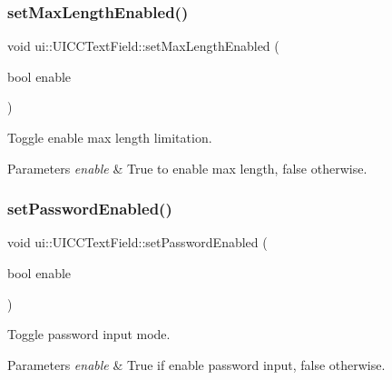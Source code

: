 \subsubsection{\texorpdfstring{set\+Max\+Length\+Enabled()}{setMaxLengthEnabled()}\hspace{0.1cm}{\footnotesize\ttfamily [2/2]}}
{\footnotesize\ttfamily void ui\+::\+U\+I\+C\+C\+Text\+Field\+::set\+Max\+Length\+Enabled (\begin{DoxyParamCaption}\item[{bool}]{enable }\end{DoxyParamCaption})}

Toggle enable max length limitation. 
\begin{DoxyParams}{Parameters}
{\em enable} & True to enable max length, false otherwise. \\
\hline
\end{DoxyParams}
\mbox{\label{classui_1_1UICCTextField_a8cec7c2ce0befc7c7f9f9e5d8bdae59a}} 
\subsubsection{\texorpdfstring{set\+Password\+Enabled()}{setPasswordEnabled()}\hspace{0.1cm}{\footnotesize\ttfamily [1/2]}}
{\footnotesize\ttfamily void ui\+::\+U\+I\+C\+C\+Text\+Field\+::set\+Password\+Enabled (\begin{DoxyParamCaption}\item[{bool}]{enable }\end{DoxyParamCaption})}



Toggle password input mode. 


\begin{DoxyParams}{Parameters}
{\em enable} & True if enable password input, false otherwise. \\
\hline
\end{DoxyParams}
\mbox{\label{classui_1_1UICCTextField_a8cec7c2ce0befc7c7f9f9e5d8bdae59a}} 
